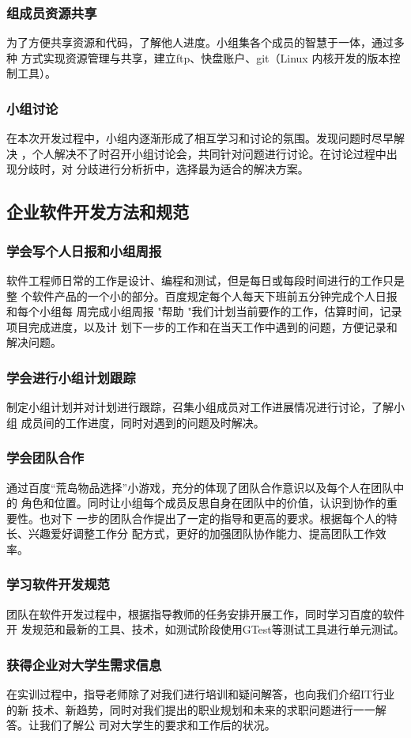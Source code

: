 \documentclass[12pt, a4paper, titlepage]{article}
\begin{document}
\subsubsection{组成员资源共享}
\par{为了方便共享资源和代码，了解他人进度。小组集各个成员的智慧于一体，通过多种
方式实现资源管理与共享，建立ftp、快盘账户、git（Linux 内核开发的版本控制工具）。}
\subsubsection{小组讨论}
\par{在本次开发过程中，小组内逐渐形成了相互学习和讨论的氛围。发现问题时尽早解决
，个人解决不了时召开小组讨论会，共同针对问题进行讨论。在讨论过程中出现分歧时，对
分歧进行分析折中，选择最为适合的解决方案。}

\subsection{企业软件开发方法和规范}
\subsubsection{学会写个人日报和小组周报}
\par{软件工程师日常的工作是设计、编程和测试，但是每日或每段时间进行的工作只是整
个软件产品的一个小的部分。百度规定每个人每天下班前五分钟完成个人日报和每个小组每
周完成小组周报 "帮助 "我们计划当前要作的工作，估算时间，记录项目完成进度，以及计
划下一步的工作和在当天工作中遇到的问题，方便记录和解决问题。}
\subsubsection{学会进行小组计划跟踪}
\par{制定小组计划并对计划进行跟踪，召集小组成员对工作进展情况进行讨论，了解小组
成员间的工作进度，同时对遇到的问题及时解决。}
\subsubsection{学会团队合作}
\par{通过百度“荒岛物品选择”小游戏，充分的体现了团队合作意识以及每个人在团队中的
角色和位置。同时让小组每个成员反思自身在团队中的价值，认识到协作的重要性。也对下
一步的团队合作提出了一定的指导和更高的要求。根据每个人的特长、兴趣爱好调整工作分
配方式，更好的加强团队协作能力、提高团队工作效率。}
\subsubsection{学习软件开发规范}
\par{ 团队在软件开发过程中，根据指导教师的任务安排开展工作，同时学习百度的软件开
发规范和最新的工具、技术，如测试阶段使用GTest等测试工具进行单元测试。}
\subsubsection{获得企业对大学生需求信息}
\par{在实训过程中，指导老师除了对我们进行培训和疑问解答，也向我们介绍IT行业的新
技术、新趋势，同时对我们提出的职业规划和未来的求职问题进行一一解答。让我们了解公
司对大学生的要求和工作后的状况。}
\end{document}
